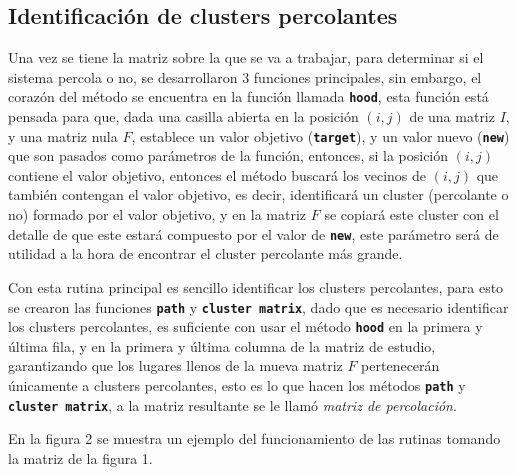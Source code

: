 \documentclass[11pt,twocolumn]{article}
\begin{document}
\subsection{\textbf{Identificación de clusters percolantes}}

Una vez se tiene la matriz sobre la que se va a trabajar, para determinar si el sistema percola o no, se desarrollaron 3 funciones principales, sin embargo, el corazón del método se encuentra en la función llamada \texttt{\textbf{hood}}, esta función está pensada para que, dada una casilla abierta en la posición $(i,j)$ de una matriz $I$, y una matriz nula $F$, establece un valor objetivo (\texttt{\textbf{target}}), y un valor nuevo (\texttt{\textbf{new}}) que son pasados como parámetros de la función, entonces, si la posición $(i,j)$ contiene el valor objetivo, entonces el método buscará los vecinos de $(i,j)$ que también contengan el valor objetivo, es decir, identificará un cluster (percolante o no) formado por el valor objetivo, y en la matriz $F$ se copiará este cluster con el detalle de que este estará compuesto por el valor de \texttt{\textbf{new}}, este parámetro será de utilidad a la hora de encontrar el cluster percolante más grande.
\vspace{0.2 cm}

Con esta rutina principal es sencillo identificar los clusters percolantes, para esto se crearon las funciones \texttt{\textbf{path}} y \texttt{\textbf{cluster matrix}}, dado que es necesario identificar los clusters percolantes, es suficiente con usar el método \texttt{\textbf{hood}} en la primera y última fila, y en la primera y última columna de la matriz de estudio, garantizando que los lugares llenos de la mueva matriz $F$ pertenecerán únicamente a clusters percolantes, esto es lo que hacen los métodos \texttt{\textbf{path}} y \texttt{\textbf{cluster matrix}}, a la matriz resultante se le llamó \textit{matriz de percolación}.
\vspace{0.2 cm}

En la figura 2 se muestra un ejemplo del funcionamiento de las rutinas tomando la matriz de la figura 1.
\end{document}
